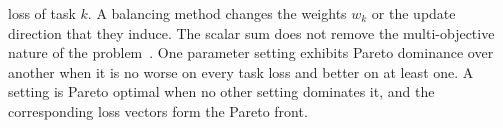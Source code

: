 loss of task $k$. A balancing method changes the weights $w_k$ or the update direction
that they induce. The scalar sum does not
remove the multi-objective nature of the problem~\cite{sener2018mgda}. One parameter
setting exhibits Pareto dominance over another when it is no worse on every task loss
and better on at least one. A setting is Pareto optimal when no other setting dominates
it, and the corresponding loss vectors form the Pareto front.

